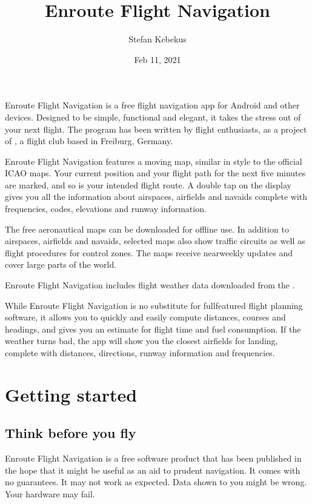 \documentclass[letterpaper,10pt,english]{sphinxmanual}
\title{Enroute Flight Navigation}
\date{Feb 11, 2021}
\author{Stefan Kebekus}
\let\sphinxpxdimen\pdfpxdimen\else\newdimen\sphinxpxdimen
\begin{document}
\pagestyle{empty}
\sphinxmaketitle
\pagestyle{plain}
\sphinxtableofcontents
\pagestyle{normal}
\label{\detokenize{index::doc}}


\noindent{\hspace*{\fill}\sphinxincludegraphics[width=100\sphinxpxdimen]{{de.akaflieg_freiburg.enroute}.png}\hspace*{\fill}}

Enroute Flight Navigation is a free flight navigation app for Android and other
devices. Designed to be simple, functional and elegant, it takes the stress out
of your next flight. The program has been written by flight enthusiasts, as a
project of , a flight club
based in Freiburg, Germany.

Enroute Flight Navigation features a moving map, similar in style to the
official ICAO maps. Your current position and your flight path for the next five
minutes are marked, and so is your intended flight route. A double tap on the
display gives you all the information about airspaces, airfields and navaids \textendash{}
complete with frequencies, codes, elevations and runway information.

The free aeronautical maps can be downloaded for offline use. In addition to
airspaces, airfields and navaids, selected maps also show traffic circuits as
well as flight procedures for control zones. The maps receive near\sphinxhyphen{}weekly
updates and cover large parts of the world.

Enroute Flight Navigation includes flight weather data downloaded from the
.

While Enroute Flight Navigation is no substitute for full\sphinxhyphen{}featured flight
planning software, it allows you to quickly and easily compute distances,
courses and headings, and gives you an estimate for flight time and fuel
consumption. If the weather turns bad, the app will show you the closest
airfields for landing, complete with distances, directions, runway information
and frequencies.

\part{Getting started}


\chapter{Think before you fly}
\label{\detokenize{01-intro/think:think-before-you-fly}}\label{\detokenize{01-intro/think::doc}}
Enroute Flight Navigation is a free software product that has been published in
the hope that it might be useful as an aid to prudent navigation.  It comes with
no guarantees.  It may not work as expected.  Data shown to you might be wrong.
Your hardware may fail.
\end{document}
